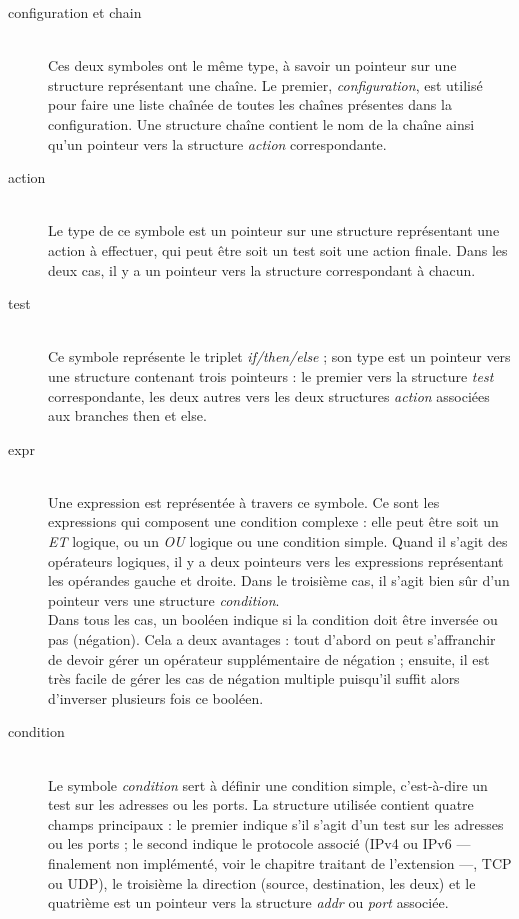 \documentclass[a4paper,11pt]{report}
\begin{document}
\begin{description}
  \item[configuration et chain]~\\
    Ces deux symboles ont le même type, à savoir
    un pointeur sur une structure représentant une chaîne. Le premier,
    \emph{configuration}, est utilisé pour faire une liste chaînée de toutes
    les chaînes présentes dans la configuration. Une structure chaîne contient
    le nom de la chaîne ainsi qu'un pointeur vers la structure \emph{action}
    correspondante.

  \item[action]~\\
    Le type de ce symbole est un pointeur sur une structure
    représentant une action à effectuer, qui peut être soit un test soit une
    action finale. Dans les deux cas, il y a un pointeur vers la structure
    correspondant à chacun.

  \item[test]~\\
    Ce symbole représente le triplet \emph{if/then/else} ; son
    type est un pointeur vers une structure contenant trois pointeurs : le
    premier vers la structure \emph{test} correspondante, les deux autres
    vers les deux structures \emph{action} associées aux branches
    \og then\fg{} et \og else\fg.

  \item[expr]~\\
    Une expression est représentée à travers ce symbole. Ce sont les
    expressions qui composent une condition complexe : elle peut être soit
    un \emph{ET} logique, ou un \emph{OU} logique ou une condition simple.
    Quand il s'agit des opérateurs logiques, il y a deux pointeurs vers les
    expressions représentant les opérandes gauche et droite. Dans le troisième
    cas, il s'agit bien sûr d'un pointeur vers une structure
    \emph{condition}.\\
    Dans tous les cas, un booléen indique si la condition doit être inversée
    ou pas (négation). Cela a deux avantages : tout d'abord on peut
    s'affranchir de devoir gérer un opérateur supplémentaire de négation ;
    ensuite, il est très facile de gérer les cas de négation multiple
    puisqu'il suffit alors d'inverser plusieurs fois ce booléen.

  \item[condition]~\\
    Le symbole \emph{condition} sert à définir une condition simple,
    c'est-à-dire un test sur les adresses ou les ports. La structure utilisée
    contient quatre champs principaux : le premier indique s'il s'agit d'un
    test sur les adresses ou les ports ; le second indique le protocole
    associé (IPv4 ou IPv6 --- finalement non implémenté, voir le chapitre
    traitant de l'extension ---, TCP ou UDP), le troisième la direction
    (source, destination, les deux) et le quatrième est un pointeur vers la
    structure \emph{addr} ou \emph{port} associée.


\end{description}
\end{document}
